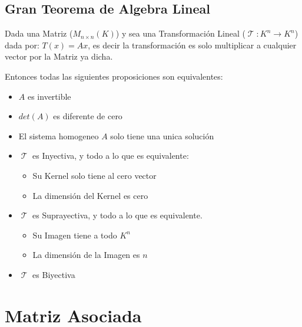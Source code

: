\documentclass[12pt]{report}                                %
\DeclareMathOperator \LinealTransformation {\mathcal{T}}
\begin{document}
    \clearpage
    \section{Gran Teorema de Algebra Lineal}

        Dada una Matriz ($M_{n \times n} (K)$) y sea una Transformación Lineal
        ($\LinealTransformation : K^n \to K^n$) dada por: $T(x) = Ax$, es decir
        la transformación es solo multiplicar a cualquier vector por la Matriz ya 
        dicha.

        Entonces todas las siguientes proposiciones son equivalentes:
        \begin{itemize}
            \item $A$ es invertible
            \item $det(A)$ es diferente de cero
            \item El sistema homogeneo $A$ solo tiene una unica solución 
            \item $\LinealTransformation$ es Inyectiva, y todo a lo que es equivalente:
                \begin{itemize}
                    \item Su Kernel solo tiene al cero vector
                    \item La dimensión del Kernel es cero
                \end{itemize}

            \item $\LinealTransformation$ es Suprayectiva, y todo a lo que es equivalente.
                \begin{itemize}
                    \item Su Imagen tiene a todo $K^n$
                    \item La dimensión de la Imagen es $n$
                \end{itemize}
            \item $\LinealTransformation$ es Biyectiva
        \end{itemize}

\chapter{Matriz Asociada}
\end{document}
